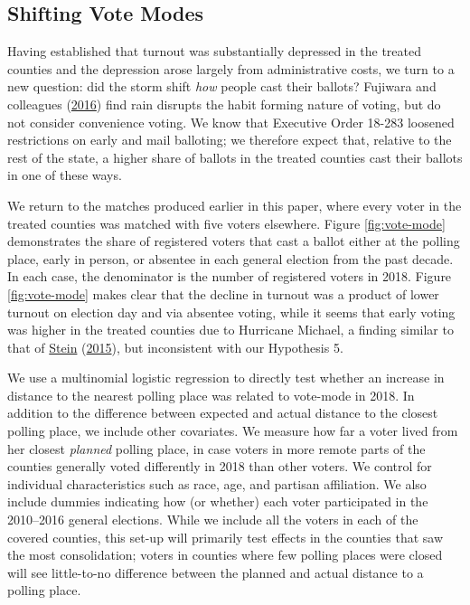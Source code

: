 \documentclass[
  12pt,
]{article}
\begin{document}
\hypertarget{shifting-vote-modes}{%
\subsection*{Shifting Vote Modes}\label{shifting-vote-modes}}

Having established that turnout was substantially depressed in the treated counties and the depression arose largely from administrative costs, we turn to a new question: did the storm shift \emph{how} people cast their ballots? Fujiwara and colleagues (\protect\hyperlink{ref-Fujiwara2016}{2016}) find rain disrupts the habit forming nature of voting, but do not consider convenience voting. We know that Executive Order 18-283 loosened restrictions on early and mail balloting; we therefore expect that, relative to the rest of the state, a higher share of ballots in the treated counties cast their ballots in one of these ways.

We return to the matches produced earlier in this paper, where every voter in the treated counties was matched with five voters elsewhere. Figure \ref{fig:vote-mode} demonstrates the share of registered voters that cast a ballot either at the polling place, early in person, or absentee in each general election from the past decade. In each case, the denominator is the number of registered voters in 2018. Figure \ref{fig:vote-mode} makes clear that the decline in turnout was a product of lower turnout on election day and via absentee voting, while it seems that early voting was higher in the treated counties due to Hurricane Michael, a finding similar to that of \protect\hyperlink{ref-Stein2015}{Stein} (\protect\hyperlink{ref-Stein2015}{2015}), but inconsistent with our Hypothesis 5.

\newpage
\begin{landscape}
\begin{singlespace}

\end{singlespace}
\end{landscape}

We use a multinomial logistic regression to directly test whether an increase in distance to the nearest polling place was related to vote-mode in 2018. In addition to the difference between expected and actual distance to the closest polling place, we include other covariates. We measure how far a voter lived from her closest \emph{planned} polling place, in case voters in more remote parts of the counties generally voted differently in 2018 than other voters. We control for individual characteristics such as race, age, and partisan affiliation. We also include dummies indicating how (or whether) each voter participated in the 2010--2016 general elections. While we include all the voters in each of the covered counties, this set-up will primarily test effects in the counties that saw the most consolidation; voters in counties where few polling places were closed will see little-to-no difference between the planned and actual distance to a polling place.
\end{document}
